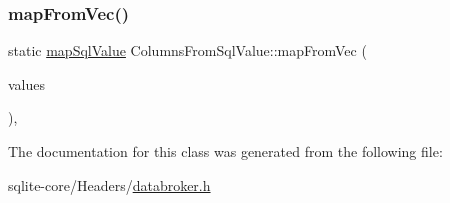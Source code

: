 \mbox{\label{classColumnsFromSqlValue_a2bd2302c62e85d239d5d4debc92e5588}} 
\subsubsection{\texorpdfstring{map\+From\+Vec()}{mapFromVec()}}
{\footnotesize\ttfamily static \mbox{\hyperlink{datadefinition_8h_a09c0cd32f8797a9ad3df7daa788656cc}{map\+Sql\+Value}} Columns\+From\+Sql\+Value\+::map\+From\+Vec (\begin{DoxyParamCaption}\item[{const vector$<$ \mbox{\hyperlink{structSqlValue}{Sql\+Value}} $>$ \&}]{values }\end{DoxyParamCaption})\hspace{0.3cm}{\ttfamily [inline]}, {\ttfamily [static]}}



The documentation for this class was generated from the following file\+:\begin{DoxyCompactItemize}
\item 
sqlite-\/core/\+Headers/\mbox{\hyperlink{databroker_8h}{databroker.\+h}}\end{DoxyCompactItemize}
